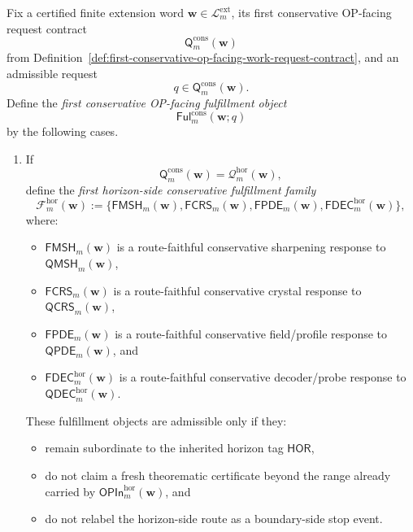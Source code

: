 \begin{definition}
\label{def:first-conservative-op-facing-response-fulfillment-layer}
Fix a certified finite extension word \(\mathbf w\in\mathcal L^{\mathrm{ext}}_{m}\), its first conservative OP-facing request contract
\[
  \mathsf{Q}^{\mathrm{cons}}_{m}(\mathbf w)
\]
from Definition~\ref{def:first-conservative-op-facing-work-request-contract}, and an admissible request
\[
  q\in \mathsf{Q}^{\mathrm{cons}}_{m}(\mathbf w).
\]
Define the \emph{first conservative OP-facing fulfillment object}
\[
  \mathsf{Ful}^{\mathrm{cons}}_{m}(\mathbf w;q)
\]
by the following cases.
\begin{enumerate}[label=(\roman*)]
  \item If
  \[
    \mathsf{Q}^{\mathrm{cons}}_{m}(\mathbf w)=\mathcal Q^{\mathrm{hor}}_{m}(\mathbf w),
  \]
  define the \emph{first horizon-side conservative fulfillment family}
  \[
    \mathcal F^{\mathrm{hor}}_{m}(\mathbf w)
    :=
    \{\mathsf{FMSH}_{m}(\mathbf w),\mathsf{FCRS}_{m}(\mathbf w),\mathsf{FPDE}_{m}(\mathbf w),\mathsf{FDEC}^{\mathrm{hor}}_{m}(\mathbf w)\},
  \]
  where:
  \begin{itemize}[leftmargin=2em]
    \item \(\mathsf{FMSH}_{m}(\mathbf w)\) is a route-faithful conservative sharpening response to \(\mathsf{QMSH}_{m}(\mathbf w)\),
    \item \(\mathsf{FCRS}_{m}(\mathbf w)\) is a route-faithful conservative crystal response to \(\mathsf{QCRS}_{m}(\mathbf w)\),
    \item \(\mathsf{FPDE}_{m}(\mathbf w)\) is a route-faithful conservative field/profile response to \(\mathsf{QPDE}_{m}(\mathbf w)\), and
    \item \(\mathsf{FDEC}^{\mathrm{hor}}_{m}(\mathbf w)\) is a route-faithful conservative decoder/probe response to \(\mathsf{QDEC}^{\mathrm{hor}}_{m}(\mathbf w)\).
  \end{itemize}
  These fulfillment objects are admissible only if they:
  \begin{itemize}[leftmargin=2em]
    \item remain subordinate to the inherited horizon tag \(\mathsf{HOR}\),
    \item do not claim a fresh theorematic certificate beyond the range already carried by \(\mathsf{OPIn}^{\mathrm{hor}}_{m}(\mathbf w)\), and
    \item do not relabel the horizon-side route as a boundary-side stop event.
  \end{itemize}

\end{enumerate}
\end{definition}
